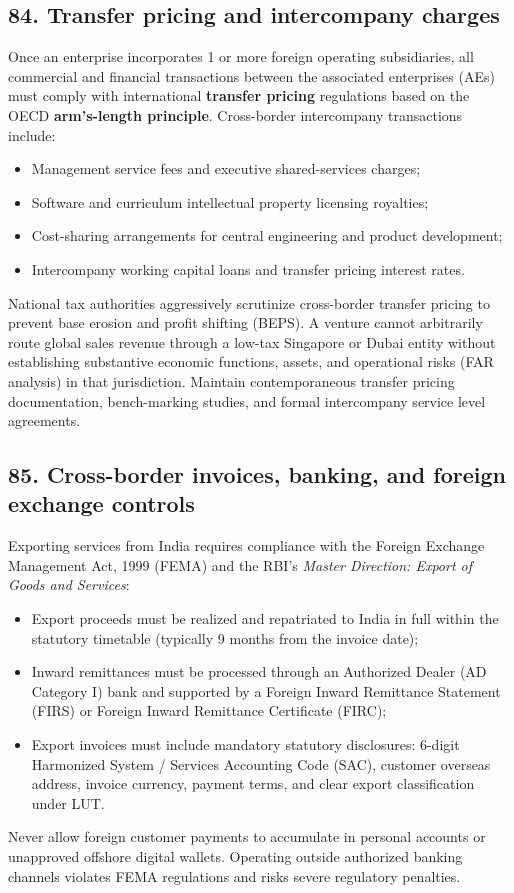 \subsection{84. Transfer pricing and intercompany charges}

Once an enterprise incorporates 1 or more foreign operating subsidiaries, all commercial and financial transactions between the associated enterprises (AEs) must comply with international \textbf{transfer pricing} regulations based on the OECD \textbf{arm's-length principle}. Cross-border intercompany transactions include:
\begin{itemize}
    \item Management service fees and executive shared-services charges;
    \item Software and curriculum intellectual property licensing royalties;
    \item Cost-sharing arrangements for central engineering and product development;
    \item Intercompany working capital loans and transfer pricing interest rates.
\end{itemize}

National tax authorities aggressively scrutinize cross-border transfer pricing to prevent base erosion and profit shifting (BEPS). A venture cannot arbitrarily route global sales revenue through a low-tax Singapore or Dubai entity without establishing substantive economic functions, assets, and operational risks (FAR analysis) in that jurisdiction. Maintain contemporaneous transfer pricing documentation, bench-marking studies, and formal intercompany service level agreements.

\subsection{85. Cross-border invoices, banking, and foreign exchange controls}

Exporting services from India requires compliance with the Foreign Exchange Management Act, 1999 (FEMA) and the RBI's \textit{Master Direction: Export of Goods and Services}:
\begin{itemize}
    \item Export proceeds must be realized and repatriated to India in full within the statutory timetable (typically 9 months from the invoice date);
    \item Inward remittances must be processed through an Authorized Dealer (AD Category I) bank and supported by a Foreign Inward Remittance Statement (FIRS) or Foreign Inward Remittance Certificate (FIRC);
    \item Export invoices must include mandatory statutory disclosures: 6-digit Harmonized System / Services Accounting Code (SAC), customer overseas address, invoice currency, payment terms, and clear export classification under LUT.
\end{itemize}
Never allow foreign customer payments to accumulate in personal accounts or unapproved offshore digital wallets. Operating outside authorized banking channels violates FEMA regulations and risks severe regulatory penalties.

